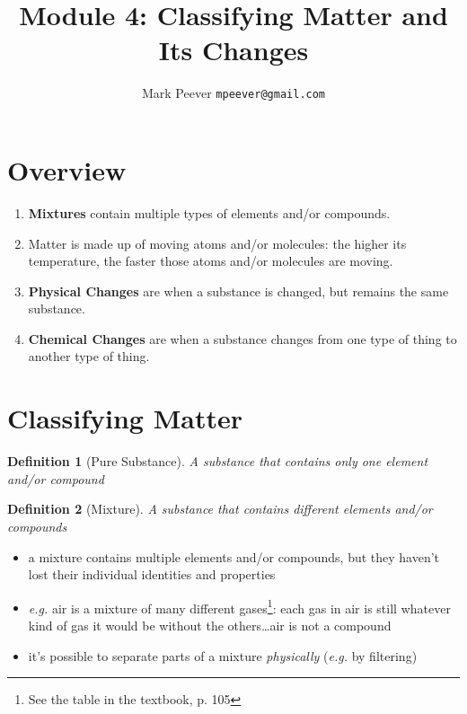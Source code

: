 \documentclass[11pt, oneside]{article}   	%
\title{Module 4: Classifying Matter and Its Changes }
\author{Mark Peever \texttt{mpeever@gmail.com}}
\newtheorem{definition}{Definition}
\begin{document}
\maketitle

\begin{center}

\end{center}

\section{Overview}
\begin{enumerate}
\item \textbf{Mixtures} contain multiple types of elements and/or compounds.
\item Matter is made up of moving atoms and/or molecules: the higher its temperature, the faster those atoms and/or molecules are moving.
\item \textbf{Physical Changes} are when a substance is changed, but remains the same substance.
\item \textbf{Chemical Changes} are when a substance changes from one type of thing to another type of thing.
\end{enumerate}

\section{Classifying Matter}

\begin{definition}[Pure Substance]\label{defn:pure-substance}
A substance that contains only one element and/or compound
\end{definition}

\begin{definition}[Mixture]\label{defn:mixture}
A substance that contains different elements and/or compounds
\end{definition}

\begin{itemize}
\item a mixture contains multiple elements and/or compounds, but they haven't lost their individual identities and properties
\item \emph{e.g.} air is a mixture of many different gases\footnote{See the table in the textbook, p. 105}: each gas in air is still whatever kind of gas it would be without the others\ldots air is not a compound
\item it's possible to separate parts of a mixture \emph{physically} (\emph{e.g.} by filtering)
\end{itemize}
\end{document}
